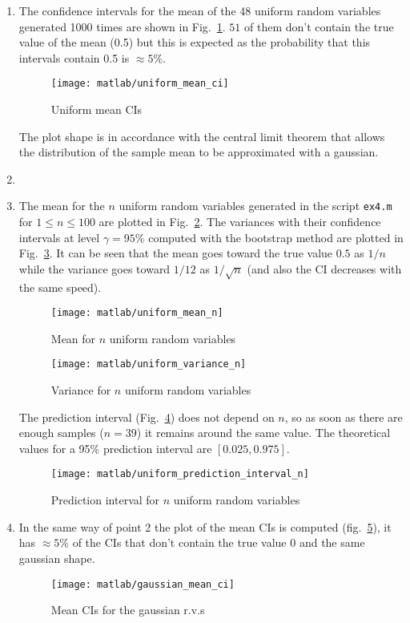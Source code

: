 \documentclass{article}
\newcommand{\inlinecode}[1]{\lstinline[basicstyle=\ttfamily,keywordstyle={}]{#1}}
\begin{document}
\begin{enumerate}
\item The confidence intervals for the mean of the 48 uniform random
  variables generated 1000 times are shown in
  Fig.~\ref{uniform_mean_ci}. $51$ of them don't contain the true
  value of the mean (0.5) but this is expected as the probability that
  this intervals contain 0.5 is $\approx 5\%$.
  \begin{figure}[htbp]
    \centering
    \texttt{[image: matlab/uniform\_mean\_ci]}
    \caption{Uniform mean CIs}
    \label{uniform_mean_ci}
  \end{figure}
  The plot shape is in accordance with the central limit theorem that
  allows the distribution of the sample mean to be approximated with a
  gaussian.
\item
\item The mean for the $n$ uniform random variables generated in the
  script \inlinecode{ex4.m} for $ 1 \leq n \leq 100 $ are plotted in
  Fig.~\ref{uniform_mean}. The variances with their confidence
  intervals at level $\gamma = 95\%$ computed with the bootstrap
  method are plotted in Fig.~\ref{uniform_var}. It can be seen that
  the mean goes toward the true value $0.5$ as $1/n$ while the
  variance goes toward $1/12$ as $1/\sqrt{n}$ (and also the CI
  decreases with the same speed).
  \begin{figure}[htbp]
    \centering
    \texttt{[image: matlab/uniform\_mean\_n]}
    \caption{Mean for $n$ uniform random variables}
    \label{uniform_mean}
  \end{figure}
  \begin{figure}[htbp]
    \centering
    \texttt{[image: matlab/uniform\_variance\_n]}
    \caption{Variance for $n$ uniform random variables}
    \label{uniform_var}
  \end{figure}
  The prediction interval (Fig.~\ref{pred_int_unif}) does not depend
  on $n$, so as soon as there are enough samples ($n=39$) it remains
  around the same value. The theoretical values for a 95\% prediction
  interval are $[0.025, 0.975]$.
  \begin{figure}[htbp]
    \centering
    \texttt{[image: matlab/uniform\_prediction\_interval\_n]}
    \caption{Prediction interval for $n$ uniform random variables}
    \label{pred_int_unif}
  \end{figure}
\item In the same way of point 2 the plot of the mean CIs is computed
  (fig.~\ref{gaussian_mean_ci}), it has $\approx 5\%$ of the CIs that
  don't contain the true value 0 and the same gaussian shape.
  \begin{figure}[htbp]
    \centering
    \texttt{[image: matlab/gaussian\_mean\_ci]}
    \caption{Mean CIs for the gaussian r.v.s}
    \label{gaussian_mean_ci}
  \end{figure}


\end{enumerate}
\end{document}
